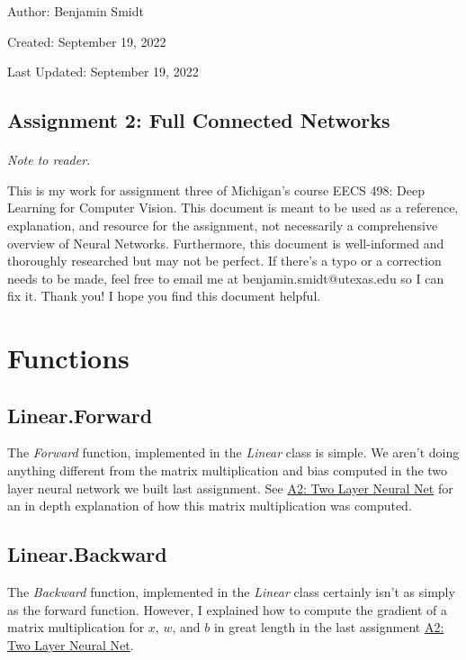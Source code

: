 \documentclass[12pt]{article}
\begin{document}
\noindent Author: Benjamin Smidt

\noindent Created: September 19, 2022

\noindent Last Updated: September 19, 2022
\begin{center}
\section*{Assignment 2: Full Connected Networks}
\end{center}

\paragraph{} \emph{Note to reader.} 

This is my work for assignment three of Michigan's course
EECS 498: Deep Learning for Computer Vision. This document is meant to be used as a reference, 
explanation, and resource for the assignment, not necessarily a comprehensive overview
of Neural Networks. Furthermore, this document is well-informed and thoroughly researched but
may not be perfect. If there's a typo or a correction needs to be made, feel free to 
email me at benjamin.smidt@utexas.edu so I can fix it. Thank you! I hope you find this 
document helpful.

\section{Functions}

\subsection{Linear.Forward}
The \emph{Forward} function, implemented in the \emph{Linear} class is simple. We aren't doing 
anything different from the matrix multiplication and bias computed in the two layer
neural network we built last assignment. See \href{https://github.com/bensmidt/EECS-498-DL-Computer-Vision/blob/main/A2/A2-Two-Layer-NN.pdf}
{A2: Two Layer Neural Net} for an in depth explanation of how this matrix multiplication was 
computed. 

\subsection{Linear.Backward}
The \emph{Backward} function, implemented in the \emph{Linear} class certainly isn't
as simply as the forward function. However, I explained how to compute the gradient of 
a matrix multiplication for $x$, $w$, and $b$ in great length in the last assignment 
\href{https://github.com/bensmidt/EECS-498-DL-Computer-Vision/blob/main/A2/A2-Two-Layer-NN.pdf}
{A2: Two Layer Neural Net}.
\end{document}
